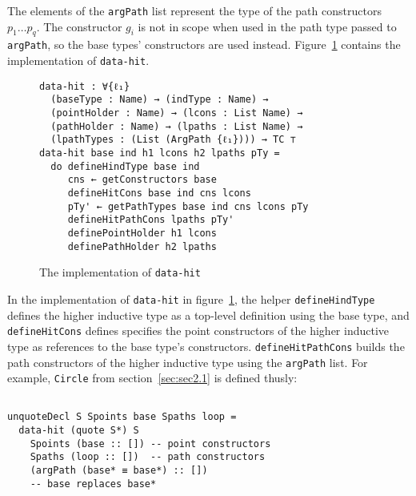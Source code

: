 \documentclass[sigplan,10pt]{acmart}
\begin{document}
The elements of the {\tt argPath} list represent the type of the path constructors $p_1 \ldots p_q$.
The constructor $g_i$ is not in scope when used in the path type passed to {\tt argPath}, so the base types' constructors are used instead.
Figure~\ref{fig:data-hit} contains the implementation of \texttt{data-hit}.

\begin{figure}
\begin{center}
\begingroup
\begin{Verbatim}
data-hit : ∀{ℓ₁} 
  (baseType : Name) → (indType : Name) →
  (pointHolder : Name) → (lcons : List Name) →
  (pathHolder : Name) → (lpaths : List Name) →
  (lpathTypes : (List (ArgPath {ℓ₁}))) → TC ⊤
data-hit base ind h1 lcons h2 lpaths pTy =
  do defineHindType base ind
     cns ← getConstructors base
     defineHitCons base ind cns lcons
     pTy' ← getPathTypes base ind cns lcons pTy
     defineHitPathCons lpaths pTy'
     definePointHolder h1 lcons
     definePathHolder h2 lpaths
\end{Verbatim}
\endgroup
\end{center}
\caption{The implementation of {\tt data-hit}}
\label{fig:data-hit}
\end{figure}
\normalsize

In the implementation of {\tt data-hit} in figure~\ref{fig:data-hit}, the helper \texttt{defineHindType} defines the higher inductive type as a top-level definition using the base type, and 
\texttt{defineHitCons} defines specifies the point constructors of the higher inductive type as references to the base type's constructors.
{\tt defineHitPathCons} builds the path constructors of the higher inductive type using the {\tt argPath} list. For example, {\tt Circle} from section~\ref{sec:sec2.1} is defined thusly:
\begin{center}
\begingroup
\begin{BVerbatim}

unquoteDecl S Spoints base Spaths loop =
  data-hit (quote S*) S
    Spoints (base :: []) -- point constructors
    Spaths (loop :: [])  -- path constructors
    (argPath (base* ≡ base*) :: []) 
    -- base replaces base*

\end{BVerbatim}
\endgroup
\end{center}
\end{document}
